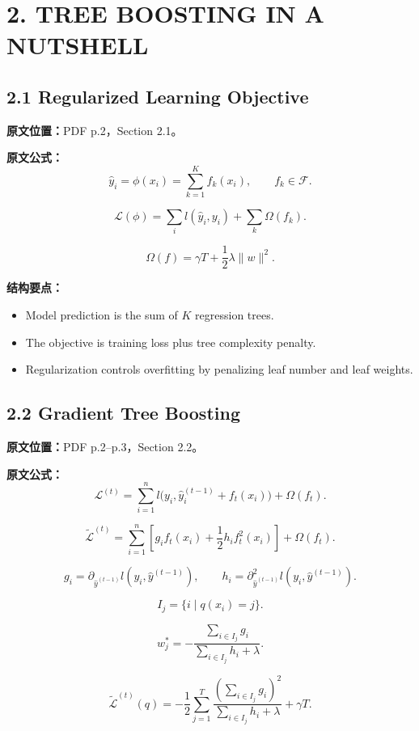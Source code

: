 \section{2. TREE BOOSTING IN A NUTSHELL}

\subsection{2.1 Regularized Learning Objective}

\textbf{原文位置：}PDF p.2，Section 2.1。

\textbf{原文公式：}
\[
  \hat{y}_i=\phi(x_i)=\sum_{k=1}^{K}f_k(x_i),\qquad f_k\in\mathcal{F}.
\]

\[
  \mathcal{L}(\phi)=\sum_i l(\hat{y}_i,y_i)+\sum_k\Omega(f_k).
\]

\[
  \Omega(f)=\gamma T+\frac{1}{2}\lambda \lVert w\rVert^2.
\]

\textbf{结构要点：}
\begin{itemize}
  \item Model prediction is the sum of $K$ regression trees.
  \item The objective is training loss plus tree complexity penalty.
  \item Regularization controls overfitting by penalizing leaf number and leaf weights.
\end{itemize}

\subsection{2.2 Gradient Tree Boosting}

\textbf{原文位置：}PDF p.2--p.3，Section 2.2。

\textbf{原文公式：}
\[
  \mathcal{L}^{(t)}
  =
  \sum_{i=1}^{n}
  l\bigl(y_i,\hat{y}_i^{(t-1)}+f_t(x_i)\bigr)
  +
  \Omega(f_t).
\]

\[
  \tilde{\mathcal{L}}^{(t)}
  =
  \sum_{i=1}^{n}
  \left[
    g_i f_t(x_i)+\frac{1}{2}h_i f_t^2(x_i)
  \right]
  +
  \Omega(f_t).
\]

\[
  g_i=\partial_{\hat{y}^{(t-1)}}l(y_i,\hat{y}^{(t-1)}),
  \qquad
  h_i=\partial^2_{\hat{y}^{(t-1)}}l(y_i,\hat{y}^{(t-1)}).
\]

\[
  I_j=\{i\mid q(x_i)=j\}.
\]

\[
  w_j^*
  =
  -
  \frac{\sum_{i\in I_j}g_i}
       {\sum_{i\in I_j}h_i+\lambda}.
\]

\[
  \tilde{\mathcal{L}}^{(t)}(q)
  =
  -
  \frac{1}{2}
  \sum_{j=1}^{T}
  \frac{\left(\sum_{i\in I_j}g_i\right)^2}
       {\sum_{i\in I_j}h_i+\lambda}
  +
  \gamma T.
\]

